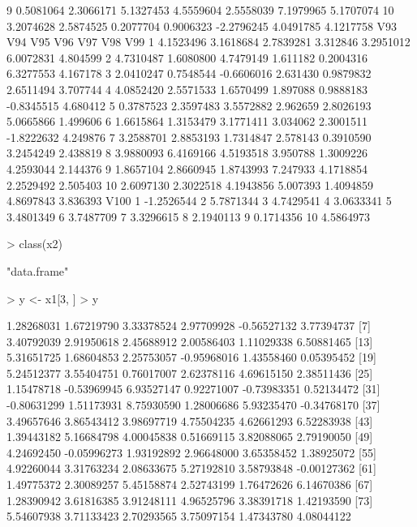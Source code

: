 \documentclass[12pt]{article}
\begin{document}
\begin{Schunk}
\begin{Soutput}
9   0.5081064 2.3066171 5.1327453 4.5559604  2.5558039 7.1979965 5.1707074
10  3.2074628 2.5874525 0.2077704 0.9006323 -2.2796245 4.0491785 4.1217758
         V93       V94        V95      V96       V97        V98      V99
1  4.1523496 3.1618684  2.7839281 3.312846 3.2951012  6.0072831 4.804599
2  4.7310487 1.6080800  4.7479149 1.611182 0.2004316  6.3277553 4.167178
3  2.0410247 0.7548544 -0.6606016 2.631430 0.9879832  2.6511494 3.707744
4  4.0852420 2.5571533  1.6570499 1.897088 0.9888183 -0.8345515 4.680412
5  0.3787523 2.3597483  3.5572882 2.962659 2.8026193  5.0665866 1.499606
6  1.6615864 1.3153479  3.1771411 3.034062 2.3001511 -1.8222632 4.249876
7  3.2588701 2.8853193  1.7314847 2.578143 0.3910590  3.2454249 2.438819
8  3.9880093 6.4169166  4.5193518 3.950788 1.3009226  4.2593044 2.144376
9  1.8657104 2.8660945  1.8743993 7.247933 4.1718854  2.2529492 2.505403
10 2.6097130 2.3022518  4.1943856 5.007393 1.4094859  4.8697843 3.836393
         V100
1  -1.2526544
2   5.7871344
3   4.7429541
4   3.0633341
5   3.4801349
6   3.7487709
7   3.3296615
8   2.1940113
9   0.1714356
10  4.5864973
\end{Soutput}
\begin{Sinput}
> class(x2)
\end{Sinput}
\begin{Soutput}
[1] "data.frame"
\end{Soutput}
\begin{Sinput}
> y <- x1[3, ] 
> y
\end{Sinput}
\begin{Soutput}
  [1]  1.28268031  1.67219790  3.33378524  2.97709928 -0.56527132  3.77394737
  [7]  3.40792039  2.91950618  2.45688912  2.00586403  1.11029338  6.50881465
 [13]  5.31651725  1.68604853  2.25753057 -0.95968016  1.43558460  0.05395452
 [19]  5.24512377  3.55404751  0.76017007  2.62378116  4.69615150  2.38511436
 [25]  1.15478718 -0.53969945  6.93527147  0.92271007 -0.73983351  0.52134472
 [31] -0.80631299  1.51173931  8.75930590  1.28006686  5.93235470 -0.34768170
 [37]  3.49657646  3.86543412  3.98697719  4.75504235  4.62661293  6.52283938
 [43]  1.39443182  5.16684798  4.00045838  0.51669115  3.82088065  2.79190050
 [49]  4.24692450 -0.05996273  1.93192892  2.96648000  3.65358452  1.38925072
 [55]  4.92260044  3.31763234  2.08633675  5.27192810  3.58793848 -0.00127362
 [61]  1.49775372  2.30089257  5.45158874  2.52743199  1.76472626  6.14670386
 [67]  1.28390942  3.61816385  3.91248111  4.96525796  3.38391718  1.42193590
 [73]  5.54607938  3.71133423  2.70293565  3.75097154  1.47343780  4.08044122

\end{Soutput}
\end{Schunk}
\end{document}
